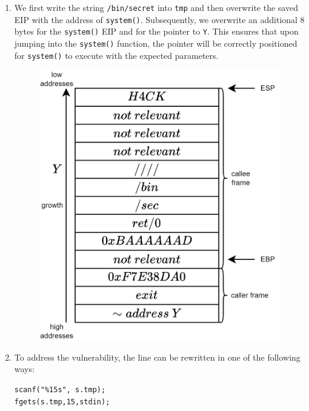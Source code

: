 \begin{enumerate}
    \item We first write the string \texttt{/bin/secret} into \texttt{tmp} and then overwrite the saved EIP with the address of \texttt{system()}. 
        Subsequently, we overwrite an additional 8 bytes for the \texttt{system()} EIP and for the pointer to \texttt{Y}. 
        This ensures that upon jumping into the \texttt{system()} function, the pointer will be correctly positioned for \texttt{system()} to execute with the expected parameters.
    \begin{figure}[H]
            \centering
            \includegraphics[width=0.5\linewidth]{images/stack5.png}
        \end{figure}
    \item To address the vulnerability, the line can be rewritten in one of the following ways:
        \begin{verbatim}
scanf("%15s", s.tmp);
fgets(s.tmp,15,stdin);
        \end{verbatim}
\end{enumerate}